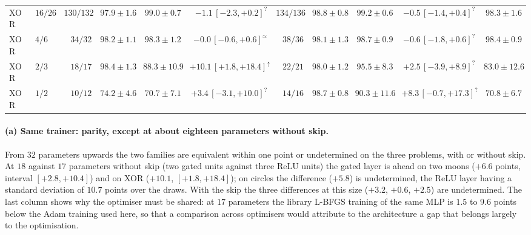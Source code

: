 \documentclass[11pt,a4paper]{article}
\theoremstyle{plain}
\theoremstyle{definition}
\theoremstyle{remark}
\begin{document}
\begin{table}[h]
{\begin{tabular}{@{}llrrrrrrrrr@{}}
\addlinespace
XOR & $16/26$ & $130/132$ & $97.9\pm1.6$ & $99.0\pm0.7$ & $-1.1\,[-2.3,+0.2]^{?}$ & $134/136$ & $98.8\pm0.8$ & $99.2\pm0.6$ & $-0.5\,[-1.4,+0.4]^{?}$ & $98.3\pm1.6$ \\
XOR & $4/6$ & $34/32$ & $98.2\pm1.1$ & $98.3\pm1.2$ & $-0.0\,[-0.6,+0.6]^{\approx}$ & $38/36$ & $98.1\pm1.3$ & $98.7\pm0.9$ & $-0.6\,[-1.8,+0.6]^{?}$ & $98.4\pm0.9$ \\
XOR & $2/3$ & $18/17$ & $98.4\pm1.3$ & $88.3\pm10.9$ & $+10.1\,[+1.8,+18.4]^{\uparrow}$ & $22/21$ & $98.0\pm1.2$ & $95.5\pm8.3$ & $+2.5\,[-3.9,+8.9]^{?}$ & $83.0\pm12.6$ \\
XOR & $1/2$ & $10/12$ & $74.2\pm4.6$ & $70.7\pm7.1$ & $+3.4\,[-3.1,+10.0]^{?}$ & $14/16$ & $98.7\pm0.8$ & $90.3\pm11.6$ & $+8.3\,[-0.7,+17.3]^{?}$ & $70.8\pm6.7$ \\
\bottomrule
\end{tabular}}
\end{table}

\paragraph{(a) Same trainer: parity, except at about eighteen parameters
without skip.} From $32$ parameters upwards the two families are equivalent
within one point or undetermined on the three problems, with or without
skip. At $18$ against $17$ parameters without
skip (two gated units against three ReLU units) the gated layer is ahead on
two moons ($+6.6$ points, interval $[+2.8,+10.4]$) and on XOR ($+10.1$,
$[+1.8,+18.4]$); on circles the difference ($+5.8$) is undetermined, the
ReLU layer having a standard deviation of $10.7$ points over the draws.
With the skip the three differences at this size ($+3.2$, $+0.6$, $+2.5$)
are undetermined. The last column shows why the optimiser must be shared:
at $17$ parameters the library L-BFGS training of the same MLP is $1.5$ to
$9.6$ points below the Adam training used here, so that a comparison
across optimisers would attribute to the architecture a gap that belongs
largely to the optimisation.
\end{document}
